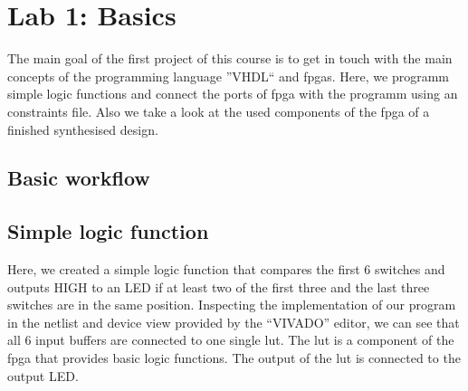\chapter{Lab 1: Basics} \label{day1}

The main goal of the first project of this course is to get in touch with the main concepts of the programming language ''VHDL`` and \glspl{fpga}. Here, we programm simple logic functions and connect the ports of \gls{fpga} with the programm using an constraints file. Also we take a look at the used components of the \gls{fpga} of a finished synthesised design.

\section{Basic workflow}



\section{Simple logic function}

Here, we created a simple logic function that compares the first 6 switches and outputs HIGH to an LED if at least two of the first three and the last three switches are in the same position. Inspecting the implementation of our program in the netlist and device view provided by the ``VIVADO'' editor, we can see that all 6 input buffers are connected to one single \gls{lut}. The \gls{lut} is a component of the \gls{fpga} that provides basic logic functions. The output of the \gls{lut} is connected to the output LED.



